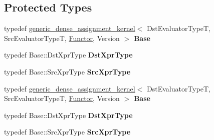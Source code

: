 \subsection*{Protected Types}
\begin{DoxyCompactItemize}
\item 
\mbox{\label{class_eigen_1_1internal_1_1triangular__dense__assignment__kernel_ac01443bfa6fe11b6eca22720a34b5eb3}} 
typedef \hyperlink{class_eigen_1_1internal_1_1generic__dense__assignment__kernel}{generic\+\_\+dense\+\_\+assignment\+\_\+kernel}$<$ Dst\+Evaluator\+TypeT, Src\+Evaluator\+TypeT, \hyperlink{struct_functor}{Functor}, Version $>$ {\bfseries Base}
\item 
\mbox{\label{class_eigen_1_1internal_1_1triangular__dense__assignment__kernel_ace1ab495e32ff0d545c8ca8fd2757111}} 
typedef Base\+::\+Dst\+Xpr\+Type {\bfseries Dst\+Xpr\+Type}
\item 
\mbox{\label{class_eigen_1_1internal_1_1triangular__dense__assignment__kernel_a31397394870e64f33a78a3a666b48d03}} 
typedef Base\+::\+Src\+Xpr\+Type {\bfseries Src\+Xpr\+Type}
\item 
\mbox{\label{class_eigen_1_1internal_1_1triangular__dense__assignment__kernel_ac01443bfa6fe11b6eca22720a34b5eb3}} 
typedef \hyperlink{class_eigen_1_1internal_1_1generic__dense__assignment__kernel}{generic\+\_\+dense\+\_\+assignment\+\_\+kernel}$<$ Dst\+Evaluator\+TypeT, Src\+Evaluator\+TypeT, \hyperlink{struct_functor}{Functor}, Version $>$ {\bfseries Base}
\item 
\mbox{\label{class_eigen_1_1internal_1_1triangular__dense__assignment__kernel_ace1ab495e32ff0d545c8ca8fd2757111}} 
typedef Base\+::\+Dst\+Xpr\+Type {\bfseries Dst\+Xpr\+Type}
\item 
\mbox{\label{class_eigen_1_1internal_1_1triangular__dense__assignment__kernel_a31397394870e64f33a78a3a666b48d03}} 
typedef Base\+::\+Src\+Xpr\+Type {\bfseries Src\+Xpr\+Type}
\end{DoxyCompactItemize}

